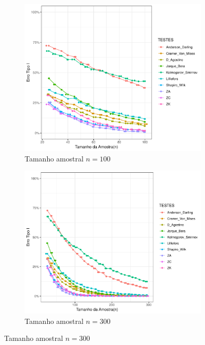 \documentclass[a4paper,11pt]{article} %
\begin{document}
\begin{figure}[H]
    \vspace{0.5cm} %
    \begin{subfigure}[b]{0.45\textwidth}
        \centering
        \includegraphics[width=\textwidth]{Distribuição Beta/Erro Tipo I/erro_tipo_I_beta_100.pdf}
        \caption{Tamanho amostral \(n = 100\)}
        \label{fig:beta_100}
    \end{subfigure}
    \hfill
    \begin{subfigure}[b]{0.45\textwidth}
        \centering
        \includegraphics[width=\textwidth]{Distribuição Beta/Erro Tipo I/erro_tipo_I_beta_300.pdf}
        \caption{Tamanho amostral \(n = 300\)}
        \label{fig:beta_300}
    \end{subfigure}
    

\end{figure}
\end{document}
